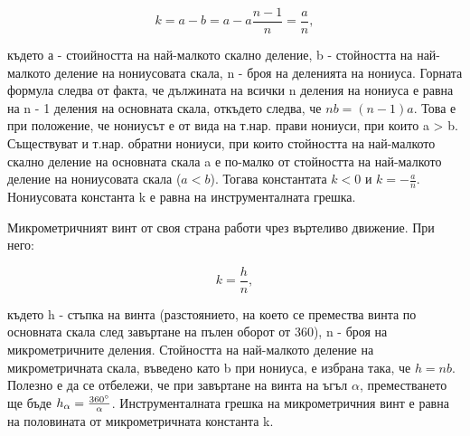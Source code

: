 \documentclass[12pt]{article}
\begin{document}
\begin{displaymath}
k = a - b = a - a\frac{n-1}{n} = \frac{a}{n},
\end{displaymath}

където а - стоийността на най-малкото скално деление, b - стойността на най-малкото деление на нониусовата скала, n - броя на деленията на нониуса. Горната формула следва от факта, че дължината на всички n деления на нониуса е равна на n - 1 деления на основната скала, откъдето следва, че \begin{math} n b=(n-1)a \end{math}. Това е при положение, че нониусът е от вида на т.нар. прави нониуси, при които a > b. Съществуват и т.нар. обратни нониуси, при които стойността на най-малкото скално деление на основната скала a е по-малко от стойността на най-малкото деление на нониусовата скала (\begin{math} a < b \end{math}). Тогава константата \begin{math} k < 0 \end{math} и \begin{math} k = - \frac{a}{n} \end{math}. Нониусовата константа k е равна на инструменталната грешка.

Микрометричният винт от своя страна работи чрез въртеливо движение. При него: 

\begin{displaymath}
k = \frac{h}{n},
\end{displaymath}

където h - стъпка на винта (разстоянието, на което се премества винта по основната скала след завъртане на пълен оборот от 360\degree), n - броя на микрометричните деления. Стойността на най-малкото деление на микрометричната скала, въведено като b при нониуса, е избрана така, че \begin{math}h = nb \end{math}. Полезно е да се отбележи, че при завъртане на винта на ъгъл \begin{math} \alpha \end{math}, преместването ще бъде \begin{math} h_\alpha = \frac{360\degree}{\alpha}\end{math}. Инструменталната грешка на микрометричния винт е равна на половината от микрометричната константа k.
\end{document}

